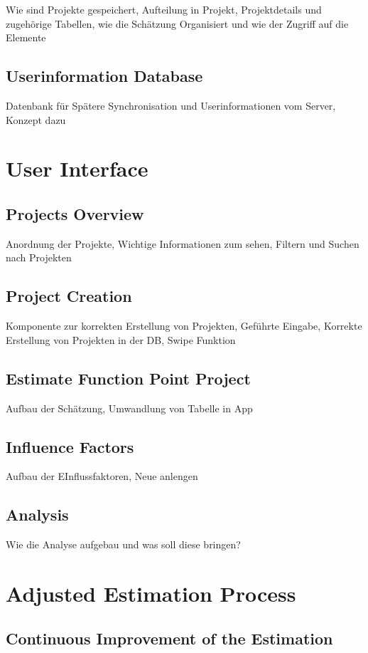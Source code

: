 Wie sind Projekte gespeichert, Aufteilung in Projekt, Projektdetails und zugehörige Tabellen, wie die Schätzung Organisiert und wie der Zugriff auf die Elemente

\subsection{Userinformation Database}

Datenbank für Spätere Synchronisation und Userinformationen vom Server, Konzept dazu

\section{User Interface}

\subsection{Projects Overview}

Anordnung der Projekte, Wichtige Informationen zum sehen, Filtern und Suchen nach Projekten

\subsection{Project Creation}

Komponente zur korrekten Erstellung von Projekten, Geführte Eingabe, Korrekte Erstellung von Projekten in der DB, Swipe Funktion

\subsection{Estimate Function Point Project}

Aufbau der Schätzung, Umwandlung von Tabelle in App

\subsection{Influence Factors}

Aufbau der EInflussfaktoren, Neue anlengen

\subsection{Analysis}

Wie die Analyse aufgebau und was soll diese bringen?

\section{Adjusted Estimation Process}\label{adjustedEstimationProcess}


\subsection{Continuous Improvement of the Estimation}

